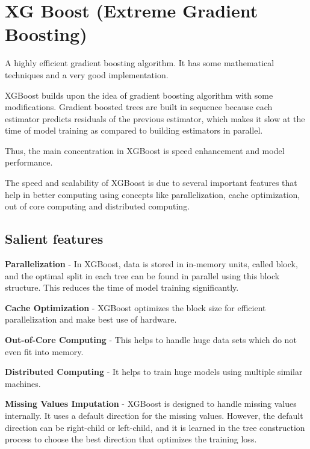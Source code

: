 	\section{XG Boost (Extreme Gradient Boosting)}
A highly efficient gradient boosting algorithm.  It has some mathematical techniques and a very good implementation.

	\begin{bulletedlist}
		\item XGBoost builds upon the idea of gradient boosting algorithm with some modifications. Gradient boosted trees are built in sequence because each estimator predicts residuals of the previous estimator, which makes it slow at the time of model training as compared to building estimators in parallel.
		\item Thus, the main concentration in XGBoost is speed enhancement and model performance.
		\item The speed and scalability of XGBoost is due to several important features that help in better computing using concepts like parallelization, cache optimization, out of core computing and
distributed computing.
	\end{bulletedlist}

	\subsection{Salient features}
	\begin{bulletedlist}
		\item \textbf{Parallelization} - In XGBoost, data is stored in in-memory units, called block, and the optimal split in each tree can be found in parallel using this block structure.  This reduces the time of model training significantly.
		\item \textbf{Cache Optimization} - XGBoost optimizes the block size for efficient parallelization and make best use of hardware.
		\item \textbf{Out-of-Core Computing} - This helps to handle huge data sets which do not even fit into memory.
		\item \textbf{Distributed Computing} - It helps to train huge models using multiple similar machines.
		\item \textbf{Missing Values Imputation} - XGBoost is designed to handle missing values internally.  It uses a default direction for the missing values. However, the default
direction can be right-child or left-child, and it is learned in the tree construction process to choose the best direction that optimizes the training loss.
	\end{bulletedlist}

